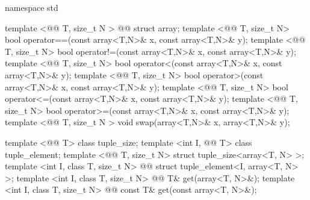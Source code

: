\documentclass[american,twoside]{book}
\begin{document}
%
%
\begin{codeblock}
namespace std {
  template <@@ T, size_t N > 
    @@
    struct array;
  template <@@ T, size_t N>
    bool operator==(const array<T,N>& x, const array<T,N>& y);
  template <@@ T, size_t N>
    bool operator!=(const array<T,N>& x, const array<T,N>& y);
  template <@@ T, size_t N>
    bool operator<(const array<T,N>& x, const array<T,N>& y);
  template <@@ T, size_t N>
    bool operator>(const array<T,N>& x, const array<T,N>& y);
  template <@@ T, size_t N>
    bool operator<=(const array<T,N>& x, const array<T,N>& y);
  template <@@ T, size_t N>
    bool operator>=(const array<T,N>& x, const array<T,N>& y);
  template <@@ T, size_t N >
    void swap(array<T,N>& x, array<T,N>& y);

  template <@@ T> class tuple_size;
  template <int I, @@ T> 
    class tuple_element;
  template <@@ T, size_t N>
    struct tuple_size<array<T, N> >;
  template <int I, class T, size_t N>
    @@
    struct tuple_element<I, array<T, N> >;
  template <int I, class T, size_t N>
    @@
    T& get(array<T, N>&); 
  template <int I, class T, size_t N>
    @@
    const T& get(const array<T, N>&);
}
\end{codeblock}

%
\end{document}
